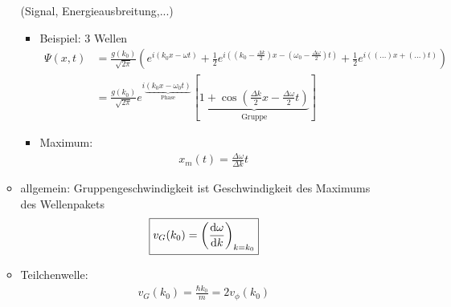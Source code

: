 \begin{itemize}
\begin{itemize}
							(Signal, Energieausbreitung,...)
									\begin{itemize}
									\item Beispiel: 3 Wellen
											\begin{align*}
											\Psi(x,t)&=\frac{g(k_0)}{\sqrt{2\pi}}\left(e^{i(k_0x-\omega t)}+\frac{1}{2}e^{i((k_0-\frac{\Delta k}{2})x-(\omega_0-\frac{\Delta\omega}{2})t)}+\frac{1}{2}e^{i((...)x+(...)t)}\right)\\
											&=\frac{g(k_0)}{\sqrt{2\pi}}e^{i\underbrace{(k_0x-\omega_0t)}_{\text{Phase}}}\left[\underbrace{1+\cos\left(\frac{\Delta k}{2}x-\frac{\Delta\omega}{2}t\right)}_{\text{Gruppe}}\right]
											\end{align*}
									\item Maximum:
											\begin{align*}
											\boxed{x_m(t)=\frac{\Delta\omega}{\Delta k}t}
											\end{align*}
									\end{itemize}
							\item allgemein: Gruppengeschwindigkeit ist Geschwindigkeit des \mbox{Maximums} des Wellenpakets
									\begin{align*}
									\boxed{v_G(k_0)=\left(\frac{\mathrm{d}\omega}{\mathrm{d} k}\right)_{k=k_0}}
									\end{align*}
							\item Teilchenwelle:
									\begin{align*}
									\boxed{v_G(k_0)=\frac{\hbar k_0}{m}=2v_{\phi}(k_0)}
									\end{align*}
							\end{itemize}
				\end{itemize}
							                
% 
